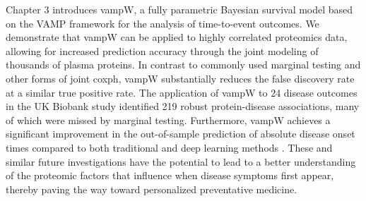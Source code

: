Chapter 3 introduces vampW, a fully parametric Bayesian survival model based on the VAMP framework for the analysis of time-to-event outcomes. We demonstrate that vampW can be applied to highly correlated proteomics data, allowing for increased prediction accuracy through the joint modeling of thousands of plasma proteins. In contrast to commonly used marginal testing and other forms of joint \acrlong{coxph}, vampW substantially reduces the false discovery rate at a similar true positive rate. The application of vampW to 24 disease outcomes in the UK Biobank study identified 219 robust protein-disease associations, many of which were missed by marginal testing. Furthermore, vampW achieves a significant improvement in the out-of-sample prediction of absolute disease onset times compared to both traditional and deep learning methods \cite{tibshirani_lasso_1997,katzman_deepsurv_2018}. These and similar future investigations have the potential to lead to a better understanding of the proteomic factors that influence when disease symptoms first appear, thereby paving the way toward personalized preventative medicine.
